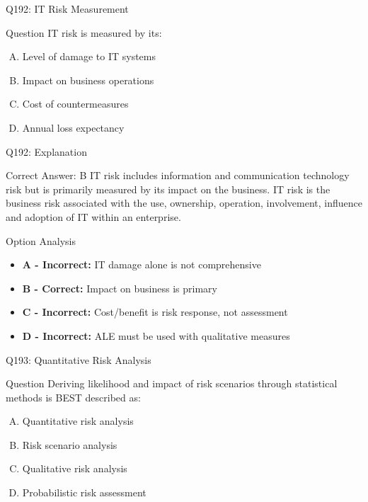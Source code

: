 \documentclass{beamer}
\begin{document}
	\begin{frame}{Q192: IT Risk Measurement}
		\begin{block}{Question}
			IT risk is measured by its:
		\end{block}
		\begin{enumerate}[(A)]
			\item Level of damage to IT systems
			\item Impact on business operations
			\item Cost of countermeasures
			\item Annual loss expectancy
		\end{enumerate}
	\end{frame}
	
	\begin{frame}{Q192: Explanation}
		\begin{block}{Correct Answer: B}
			IT risk includes information and communication technology risk but is primarily measured by its impact on the business. IT risk is the business risk associated with the use, ownership, operation, involvement, influence and adoption of IT within an enterprise.
		\end{block}
		\begin{block}{Option Analysis}
			\begin{itemize}
				\item \textbf{A - Incorrect:} IT damage alone is not comprehensive
				\item \textbf{B - Correct:} Impact on business is primary
				\item \textbf{C - Incorrect:} Cost/benefit is risk response, not assessment
				\item \textbf{D - Incorrect:} ALE must be used with qualitative measures
			\end{itemize}
		\end{block}
	\end{frame}
	
	\begin{frame}{Q193: Quantitative Risk Analysis}
		\begin{block}{Question}
			Deriving likelihood and impact of risk scenarios through statistical methods is BEST described as:
		\end{block}
		\begin{enumerate}[(A)]
			\item Quantitative risk analysis
			\item Risk scenario analysis
			\item Qualitative risk analysis
			\item Probabilistic risk assessment
		\end{enumerate}
	\end{frame}
	
\end{document}
